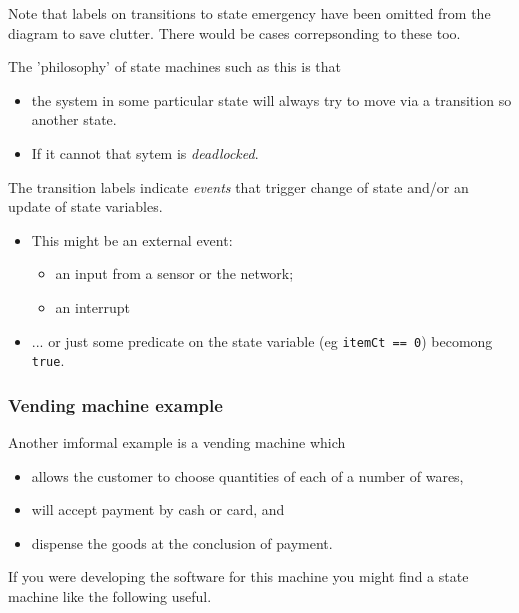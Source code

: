\documentclass[10pt, hyperref={pdfpagelabels=false}]{beamer}
\begin{document}
\begin{frame}
Note that labels on transitions to state {\color{brown}emergency} have been omitted from the diagram to save clutter. There would be cases correpsonding to these too.

The 'philosophy' of state machines such as this is that
\begin{itemize}
\item the system in some particular state will always try to move via a transition so another state.
\item If it cannot that sytem is \emph{deadlocked}.
\end{itemize}

The transition labels indicate \emph{events} that trigger change of state and/or an update of state variables.
\begin{itemize}
\item This might be an external event:
  \begin{itemize}
  \item an input from a sensor or the network;
  \item an interrupt
  \end{itemize}
\item ... or just some predicate on the state variable (eg \texttt{\color{blue}itemCt == 0}) becomong \texttt{\color{blue}true}.
\end{itemize}
\end{frame}

\begin{frame}
\frametitle{Vending machine example}
Another imformal example is a vending machine which
\begin{itemize}
\item allows the customer to choose quantities of each of a number of wares,
\item will accept payment by cash or card, and
\item dispense the goods at the conclusion of payment.
\end{itemize}

If you were developing the software for this machine you might find a state machine like the following useful.
\end{frame}
\end{document}
